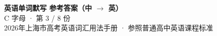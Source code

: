 \documentclass[10pt,a4paper]{article}
\begin{document}
\pagestyle{plain}

\begin{center}
{\LARGE\bfseries 英语单词默写 \quad 参考答案（中 $\to$ 英）}\\[0.22em]
{\large C 字母 · 第 3 / 8 份}\\[0.18em]
{\small 2026年上海市高考英语词汇用法手册 · 参照普通高中英语课程标准}
\end{center}

\vspace{0.2em}
\noindent{\color{rulegray}\rule{\textwidth}{0.8pt}}

\vspace{0.35em}

\vspace{0.25em}
\renewcommand{\arraystretch}{1.32}
\end{document}
